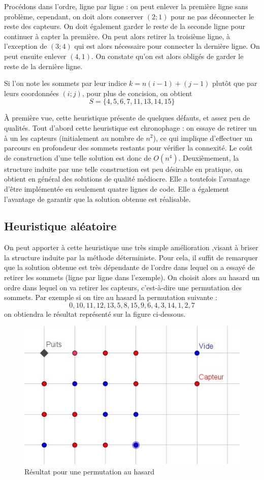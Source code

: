 \documentclass[12pt,a4paper]{article}
\begin{document}
Procédons dans l'ordre, ligne par ligne :  on peut enlever la première ligne sans problème, cependant, on doit alors conserver $(2;1)$ pour ne pas déconnecter le reste des capteurs. On doit également garder le reste de la seconde ligne pour continuer à capter la première. On peut alors retirer la troisième ligne, à l'exception de $(3;4)$ qui est alors nécessaire pour connecter la dernière ligne. On peut ensuite enlever $(4,1)$. On constate qu'on est alors obligés de garder le reste de la dernière ligne.

Si l'on note les sommets par leur indice $k=n(i-1)+(j-1)$ plutôt que par leurs coordonnées $(i;j)$, pour plus de concision, on obtient
\[S=\{4,5,6,7,11,13,14,15\}\]

À première vue, cette heuristique présente de quelques défauts, et assez peu de qualités. Tout d'abord cette heuristique est chronophage : on essaye de retirer un à un les capteurs (initialement au nombre de $n^2$), ce qui implique d'effectuer un parcours en profondeur des sommets restants pour vérifier la connexité. Le coût de construction d'une telle solution est donc de $O(n^4)$. Deuxièmement, la structure induite par une telle construction est peu désirable en pratique, on obtient en général des solutions de qualité médiocre. Elle a toutefois l'avantage d'être implémentée en seulement quatre lignes de code. Elle a également l'avantage de garantir que la solution obtenue est réalisable. 
\subsection{Heuristique aléatoire} 
On peut apporter à cette heuristique une très simple amélioration ,visant à briser la structure induite par la méthode déterministe. Pour cela, il suffit de remarquer que la solution obtenue est très dépendante de l'ordre dans lequel on a essayé de retirer les sommets (ligne par ligne dans l'exemple). On choisit alors au hasard un ordre dans lequel on va retirer les capteurs, c'est-à-dire une permutation des sommets. Par exemple si on tire au hasard la permutation suivante : \[0,10,11,12,13,5,8,15,9,6,4,3,14,1,2,7\] on obtiendra le résultat représenté sur la figure ci-dessous.
\begin{figure}[h]
\center
\includegraphics[scale=1]{Images/4_1_1_random.jpg}
\caption{Résultat pour une permutation au hasard}
\end{figure}
\end{document}
